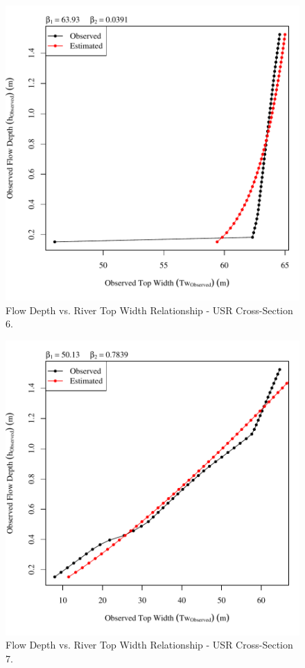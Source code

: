 \begin{center}
\begin{figure}[htbp]
	\includegraphics[width=6in]{"Figures/Results_USR/Survey Tw vs H-Section 6"}
	\caption{Flow Depth vs. River Top Width Relationship - USR Cross-Section 6.}
\end{figure}
\end{center}
\newpage

\begin{center}
\begin{figure}[htbp]
	\includegraphics[width=6in]{"Figures/Results_USR/Survey Tw vs H-Section 7"}
	\caption{Flow Depth vs. River Top Width Relationship - USR Cross-Section 7.}
\end{figure}
\end{center}
\newpage

